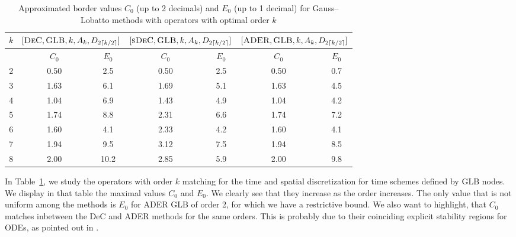 \begin{table}
	\centering
	\caption{Approximated border values $C_0$ (up to 2 decimals) and $E_0$ (up to 1 decimal) for Gauss--Lobatto methods with operators with optimal order $k$}\label{tab:CE_values}
	\begin{tabular}{|c||c|c||c|c||c|c|}\hline
				$k$&
		\multicolumn{2}{|c||}{$[\textsc{DeC},\textsc{GLB},k,A_k,D_{2\lceil k/2 \rceil}]$}&
		\multicolumn{2}{|c||}{$[\textsc{sDeC},\textsc{GLB},k,A_k,D_{2\lceil k/2 \rceil}]$}&
		\multicolumn{2}{|c|}{$[\textsc{ADER},\textsc{GLB},k,A_k,D_{2\lceil k/2 \rceil}]$}\\\hline
		&$\qquad C_0\qquad$&$E_0$&$\qquad C_0\qquad$&$E_0$&$\qquad C_0\qquad$&$E_0$\\\hline
		2& 0.50 &2.5&0.50&2.5&0.50&0.7\\
		3& 1.63 &6.1&1.69&5.1&1.63&4.5\\
		4& 1.04&6.9&1.43&4.9&1.04&4.2\\
		5& 1.74&8.8&2.31&6.6&1.74&7.2\\
		6& 1.60&4.1&2.33&4.2&1.60&4.1\\
		7& 1.94&9.5&3.12&7.5&1.94&8.5\\
		8&2.00&10.2&2.85&5.9&2.00&9.8\\ \hline
	\end{tabular}
\end{table}

In Table~\ref{tab:CE_values}, we study the operators with order $k$ matching for the time and spatial discretization for time schemes defined by GLB nodes. We display in that table the maximal values $C_0$ and $E_0$. 
We clearly see that they increase as the order increases. 
The only value that is not uniform among the methods is $E_0$ for ADER GLB of order 2, for which we have a restrictive bound.
We also want to highlight, that $C_0$ matches inbetween the DeC and ADER methods for the same orders. This is probably due to their coinciding explicit stability regions for ODEs, as pointed out in \cite{Han_Veiga_2021}.